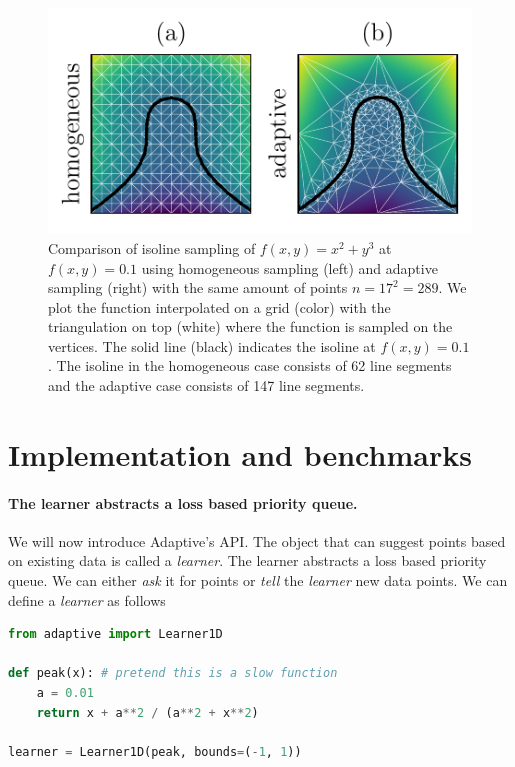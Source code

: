 \documentclass[english, twocolumn, 10pt, aps, superscriptaddress, floatfix, prb, citeautoscript]{revtex4-1}
\begin{document}
\begin{figure}
\hypertarget{fig:isoline}{%
\centering
\includegraphics{figures/isoline.pdf}
\caption{Comparison of isoline sampling of \(f(x,y)=x^2 + y^3\) at \(f(x,y)=0.1\) using homogeneous sampling (left) and adaptive sampling (right) with the same amount of points \(n=17^2=289\).
We plot the function interpolated on a grid (color) with the triangulation on top (white) where the function is sampled on the vertices.
The solid line (black) indicates the isoline at \(f(x,y)=0.1\).
The isoline in the homogeneous case consists of 62 line segments and the adaptive case consists of 147 line segments.}\label{fig:isoline}
}
\end{figure}

\hypertarget{implementation-and-benchmarks}{%
\section{Implementation and benchmarks}\label{implementation-and-benchmarks}}

\hypertarget{the-learner-abstracts-a-loss-based-priority-queue.}{%
\paragraph{The learner abstracts a loss based priority queue.}\label{the-learner-abstracts-a-loss-based-priority-queue.}}

We will now introduce Adaptive's API.
The object that can suggest points based on existing data is called a \emph{learner}.
The learner abstracts a loss based priority queue.
We can either \emph{ask} it for points or \emph{tell} the \emph{learner} new data points.
We can define a \emph{learner} as follows

\begin{lstlisting}[language=Python]
from adaptive import Learner1D

def peak(x): # pretend this is a slow function
    a = 0.01
    return x + a**2 / (a**2 + x**2)

learner = Learner1D(peak, bounds=(-1, 1))
\end{lstlisting}
\end{document}
